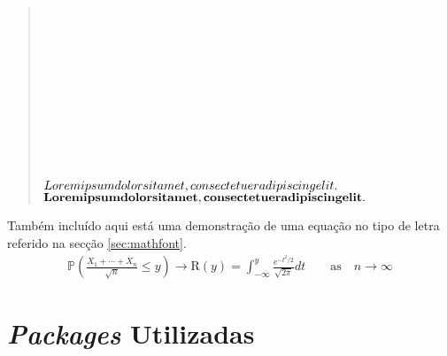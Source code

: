 \documentclass{../ist-thesis}
\begin{document}
\newrobustcmd*{}
\begin{quote}
	\textsample \\
	{\bfseries\textsample} \\
	{\itshape\textsample} \\
	{\bfseries\itshape\textsample} \\
	{\scshape\textsample} \\
	{\bfseries\scshape\textsample} \\
	{\ttfamily\textsample} \\
	{\bfseries\ttfamily\textsample} \\
	{\rmfamily\textsample} \\
	{\bfseries\rmfamily\textsample} \\
	{$Lorem ipsum dolor sit amet, consectetuer adipiscing elit.$} \\
	{$\mathbf{Lorem ipsum dolor sit amet, consectetuer adipiscing elit.}$} \\
\end{quote}

Também incluído aqui está uma demonstração de uma equação no tipo de letra  referido na secção \ref{sec:mathfont}.
\begin{gather*}
	\mathbb{P}\left(\frac{X_1 + \cdots + X_n}{\sqrt{n}} \leq y\right) \rightarrow \mathrm{R}(y) = \int_{-\infty}^{y} \frac{e^{-t^2/2}}{\sqrt{2\pi}}dt \qquad \mathrm{as} \quad n \rightarrow \infty
\end{gather*}

\section{\textit{Packages} Utilizadas}
\end{document}
